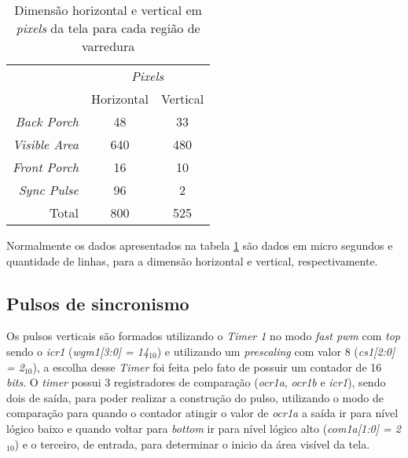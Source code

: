 \documentclass[twocolumn]{article}
\begin{document}
    \begin{table}[H]
        \centering
        \begin{tabular}{r c c}                                            \cline{2-3}
                                  & \multicolumn{2}{c}{\textsl{Pixels}} \\\cline{2-3}
                                  & Horizontal      & Vertical          \\\hline
            \textsl{Back Porch}   & 48              & 33                \\
            \textsl{Visible Area} & 640             & 480               \\
            \textsl{Front Porch}  & 16              & 10                \\
            \textsl{Sync Pulse}   & 96              & 2                 \\
            Total                 & 800             & 525               \\\hline
        \end{tabular}
        \caption{Dimensão horizontal e vertical em \textsl{pixels} da tela para cada região de varredura}
        \label{tab:dimensions_scanning_regions}
    \end{table}

    Normalmente os dados apresentados na tabela \ref{tab:dimensions_scanning_regions} são dados em micro segundos e quantidade de linhas, para a dimensão horizontal e vertical, respectivamente.
    
    \subsection{Pulsos de sincronismo}
        Os pulsos verticais são formados utilizando o \textsl{Timer 1} no modo \textsl{fast pwm} com \textsl{top} sendo o \textsl{icr1} (\textsl{wgm1[3:0] = 14\(_{10}\)}) e utilizando um \textsl{prescaling} com valor 8 (\textsl{cs1[2:0] = 2\(_{10}\)}), a escolha desse \textsl{Timer} foi feita pelo fato de possuir um contador de 16 \textsl{bits}. O \textsl{timer} possui 3 registradores de comparação (\textsl{ocr1a}, \textsl{ocr1b} e \textsl{icr1}), sendo dois de saída, para poder realizar a construção do pulso, utilizando o modo de comparação para quando o contador atingir o valor de \textsl{ocr1a} a saída ir para nível lógico baixo e quando voltar para \textsl{bottom} ir para nível lógico alto (\textsl{com1a[1:0] = 2\(_{10}\)}) e o terceiro, de entrada, para determinar o inicio da área visível da tela.
\end{document}
